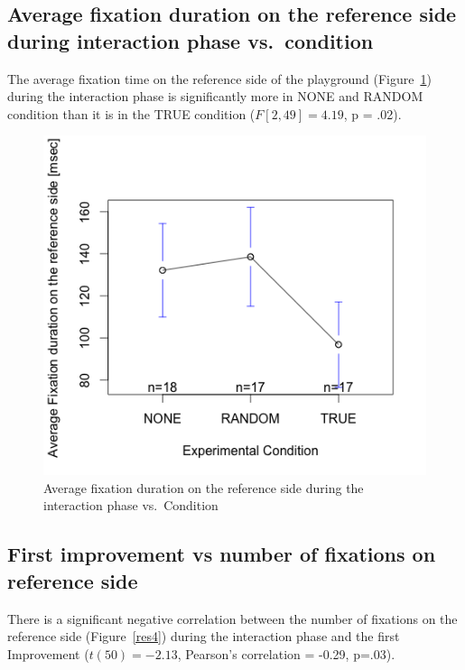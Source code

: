\documentclass{sig-alternate}
\begin{document}
\subsection{Average fixation duration on the reference side during interaction
phase vs.~condition}

The average fixation time on the reference side of the playground
(Figure~\ref{res3}) during the interaction phase is significantly more in NONE
and RANDOM condition than it is in the TRUE condition ($F[2,49]=4.19$,
p = .02).

\begin{figure}[h!]
    \centering
    \includegraphics[width=0.8\linewidth]{res3}
    \caption{Average fixation duration on the reference side during the
    interaction phase vs.~Condition}
    \label{res3}
\end{figure}

\subsection{First improvement vs number of fixations on reference side}

There is a significant negative correlation between the number of
fixations on the reference side (Figure~\ref{res4}) during the interaction phase
and the first Improvement ($t(50)=-2.13$, Pearson's correlation = -0.29, p=.03).
\end{document}
